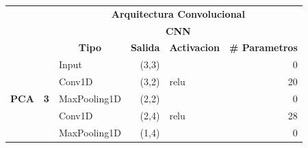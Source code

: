\begin{table}[]
\centering
\begin{center}
\begin{tabular}{ll|l|r|l|r|}
\cline{3-6}
                                                    &                             & \multicolumn{4}{c|}{\textbf{Arquitectura Convolucional}}                                                                                                           \\ \cline{3-6} 
                                                    &                             & \multicolumn{4}{c|}{\textbf{CNN}}                                                                                                                                  \\ \cline{3-6} 
                                                    &                             & \multicolumn{1}{c|}{\textbf{Tipo}} & \multicolumn{1}{c|}{\textbf{Salida}} & \multicolumn{1}{c|}{\textbf{Activacion}} & \multicolumn{1}{l|}{\textbf{\# Parametros}} \\ \hline
\multicolumn{1}{|l|}{\multirow{8}{*}{\textbf{PCA}}} & \multirow{8}{*}{\textbf{3}} & Input                              & (3,3)                                &                                          & 0                                           \\ \cline{3-6} 
\multicolumn{1}{|l|}{}                              &                             & Conv1D                             & (3,2)                                & relu                                     & 20                                          \\ \cline{3-6} 
\multicolumn{1}{|l|}{}                              &                             & MaxPooling1D                       & (2,2)                                &                                          & 0                                           \\ \cline{3-6} 
\multicolumn{1}{|l|}{}                              &                             & Conv1D                             & (2,4)                                & relu                                     & 28                                          \\ \cline{3-6} 
\multicolumn{1}{|l|}{}                              &                             & MaxPooling1D                       & (1,4)                                &                                          & 0                                           \\ \cline{3-6} 

\end{tabular}
\end{center}
\end{table}
